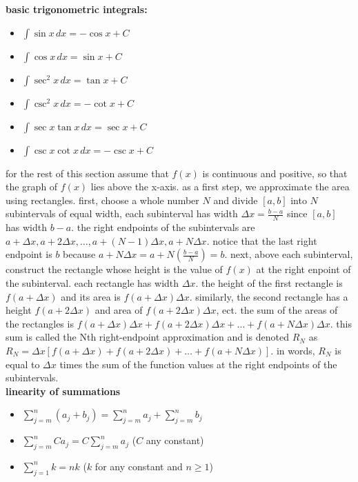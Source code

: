 \documentclass{article}
\begin{document}
\textbf{basic trigonometric integrals:}
	\begin{itemize}		
		\item $\int \sin x \,dx = -\cos x + C$
		\item $\int \cos x \,dx = \sin x + C$
		\item $\int \sec^2 x \,dx = \tan x + C$
		\item $\int \csc^2 x \,dx = -\cot x + C$
		\item $\int \sec x \tan x \,dx = \sec x + C$
		\item $\int \csc x \cot x \,dx = -\csc x + C$
	\end{itemize}

for the rest of this section assume that $f(x)$ is continuous and positive, so that the graph of $f(x)$ lies above the x-axis. as a first step, we approximate the area using rectangles. first, choose a whole number $N$ and divide $[a, b]$ into $N$ subintervals of equal width, each subinterval has width $\Delta x = \frac{b - a}{N}$ since $[a, b]$ has width $b - a$. the right endpoints of the subintervals are $a + \Delta x, a + 2\Delta x, \ldots, a + (N - 1)\Delta x, a + N\Delta x$. notice that the last right endpoint is $b$ because $a + N\Delta x = a + N(\frac{b - a}{N}) = b$. next, above each subinterval, construct the rectangle whose height is the value of $f(x)$ at the right enpoint of the subinterval. each rectangle has width $\Delta x$. the height of the first rectangle is $f(a + \Delta x)$ and its area is $f(a + \Delta x)\Delta x$. similarly, the second rectangle has a height $f(a + 2\Delta x)$ and area of $f(a + 2\Delta x)\Delta x$, ect. the sum of the areas of the rectangles is $f(a + \Delta x)\Delta x + f(a + 2\Delta x)\Delta x + \ldots + f(a + N\Delta x)\Delta x$. this sum is called the Nth right-endpoint approximation and is denoted $R_N$ as $R_N = \Delta x[f(a + \Delta x) + f(a + 2\Delta x) + \ldots + f(a + N\Delta x)]$. in words, $R_N$ is equal to $\Delta x$ times the sum of the function values at the right endpoints of the subintervals.\\

\textbf{linearity of summations}
	\begin{itemize}
		\item $\sum_{j=m}^{n}(a_j + b_j) = \sum_{j=m}^{n}a_j + \sum_{j=m}^{n}b_j$
		\item $\sum_{j=m}^{n}Ca_j = C\sum_{j=m}^{n}a_j$ ($C$ any constant)
		\item $\sum_{j=1}^{n}k = nk$ ($k$ for any constant and $n \geq 1$)
	\end{itemize}
\end{document}
